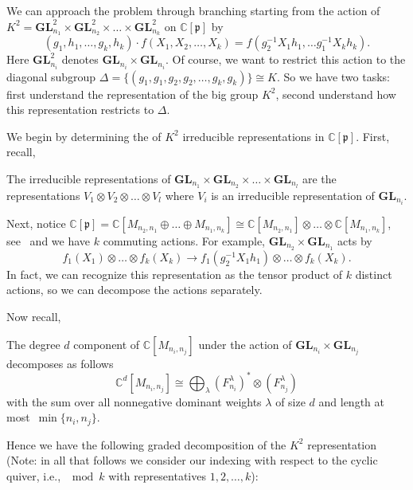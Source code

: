 \documentclass[ALCO,Unicode]{cedram}
\newcommand{\C}{\mathbb{C}}
\newcommand{\p}{\mathfrak{p}}
\newcommand{\GL}{\textbf{GL}}
\begin{document}
We can approach the problem through branching starting from the action of $K^2 = \GL_{n_1}^2 \times \GL_{n_2}^2 \times  \dots \times \GL_{n_k}^2$ on $\C[\p]$  by 
$$(g_1,h_1, \dots ,g_k, h_k) \cdot f(X_1,X_2, \dots , X_k) = f(g_2^{-1} X_1 h_1, \dots g_1^{-1} X_k h_k).$$
Here $\GL_{n_i}^2$ denotes $\GL_{n_i} \times \GL_{n_i}$. Of course, we want to restrict this action to the diagonal subgroup $\Delta = \{(g_1,g_1,g_2,g_2, \dots , g_k,g_k) \} \cong K$. So we have two tasks: first understand the representation of the big group $K^2$, second understand how this representation restricts to $\Delta$. 

We begin by determining the of $K^2$ irreducible representations in $\C[\p]$. First, recall,
    
    \begin{prop} The irreducible representations of $\GL_{n_1} \times \GL_{n_2} \times \dots \times \GL_{n_l}$ are the representations $V_1 \otimes V_2 \otimes \dots \otimes V_l$ where $V_i$ is an irreducible representation of $\GL_{n_i}$.
    \end{prop}
        
Next, notice $\C[\p] = \C[M_{n_2,n_1} \oplus \dots \oplus M_{n_1,n_k}] \cong \C[M_{n_2,n_1} ]\otimes \dots \otimes \C[M_{n_1,n_k}]$, see~\cite[Lemma A.1.9]{GoodmanWallach2009} and we have $k$ commuting actions. For example, $\GL_{n_2} \times \GL_{n_1}$ acts by 
$$f_1(X_1) \otimes \dots \otimes f_k(X_k)\to f_1(g_2^{-1}X_1 h_1) \otimes \dots \otimes f_k(X_k).$$
In fact, we can recognize this representation as the tensor product of $k$ distinct actions, so we can decompose the actions separately. 

Now recall,

    \begin{thm} The degree $d$ component of $\C[M_{n_i,n_j}]$ under the action of $\GL_{n_i} \times \GL_{n_j}$ decomposes as follows
$$\C^d[M_{n_i,n_j}] \cong \bigoplus_\lambda (F_{n_i}^\lambda)^*\otimes (F_{n_j}^\lambda)$$
with the sum over all nonnegative dominant weights $\lambda$ of size $d$ and length at most~$\min\{n_i,n_j\}$.
\end{thm}

Hence we have the following graded decomposition of the $K^2$ representation (Note: in all that follows we consider our indexing with respect to the cyclic quiver, i.e., $\mod k$ with representatives $1, 2, \ldots, k$):
\end{document}
